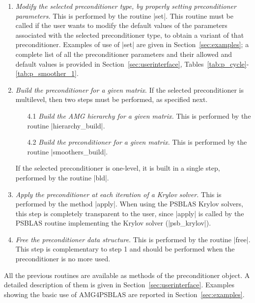 \begin{enumerate}
\item \emph{Modify the selected preconditioner type, by properly
    setting   preconditioner parameters.} This is performed by the
  routine \fortinline|set|.   This routine must be called if the
  user wants to modify the default values  of the parameters
  associated with the selected preconditioner type, to obtain a
  variant   of that preconditioner. Examples of use of
  \fortinline|set| are given in   Section~\ref{sec:examples}; a
  complete list of all the   preconditioner parameters and their
  allowed and default values is provided in
  Section~\ref{sec:userinterface},
  Tables~\ref{tab:p_cycle}-\ref{tab:p_smoother_1}. 
\item \emph{Build the preconditioner for a given matrix}. If the selected preconditioner
 is multilevel, then two steps must be performed, as specified next.
\begin{enumerate}
\item[4.1] \emph{Build the AMG hierarchy for a given matrix.} This is
performed by the routine \fortinline|hierarchy_build|.
\item[4.2] \emph{Build the preconditioner for a given matrix.} This is performed
by the routine \fortinline|smoothers_build|.
\end{enumerate}
 If the selected preconditioner is one-level, it is built in a single step,
performed by the routine \fortinline|bld|.
\item \emph{Apply the preconditioner at each iteration of a Krylov solver.}
  This is performed by the method \fortinline|apply|. When using the PSBLAS Krylov solvers,
  this step is completely transparent to the user, since \fortinline|apply| is called
  by the PSBLAS routine implementing the Krylov solver (\fortinline|psb_krylov|).
\item \emph{Free the preconditioner data structure}. This is performed by
  the routine \fortinline|free|. This step is complementary to step 1 and should
  be performed when the preconditioner is no more used.
\end{enumerate}

All the previous routines are available as methods of the preconditioner object.
A detailed description of them is given in Section~\ref{sec:userinterface}.
Examples showing the basic use of AMG4PSBLAS are reported in Section~\ref{sec:examples}.


